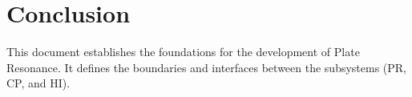 \section{Conclusion}
This document establishes the foundations for the development of Plate Resonance. It defines the boundaries and interfaces between the subsystems (PR, CP, and HI).